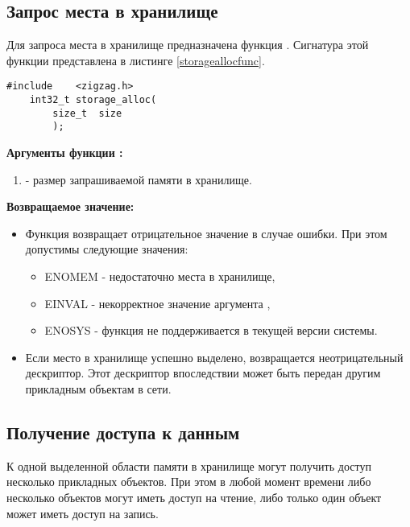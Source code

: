 \subsection{Запрос места в хранилище}

Для запроса места в хранилище предназначена функция . Сигнатура этой функции 
представлена в листинге \ref{storageallocfunc}.

\begin{lstlisting}[caption=Функция \myfunc{storage\_alloc()} - запрос места в хранилище, label=storageallocfunc]
    #include    <zigzag.h>
    int32_t storage_alloc(
        size_t  size
        );
\end{lstlisting}

{\bfseries Аргументы функции :}

{\itshape
\begin{enumerate} 
\item {} - размер запрашиваемой памяти в хранилище.
\end{enumerate}
}

{\bfseries Возвращаемое значение:}

{\itshape
\begin{itemize}
\item Функция возвращает отрицательное значение в случае ошибки. При этом допустимы следующие значения:
    \begin{itemize}
        \item ENOMEM - недостаточно места в хранилище,
        \item EINVAL - некорректное значение аргумента ,
        \item ENOSYS - функция не поддерживается в текущей версии системы.
    \end{itemize}
\item Если место в хранилище успешно выделено, возвращается неотрицательный дескриптор. Этот дескриптор впоследствии
может быть передан другим прикладным объектам в сети.
\end{itemize}
}

\subsection{Получение доступа к данным}

К одной выделенной области памяти в хранилище могут получить доступ несколько прикладных объектов. При этом
в любой момент времени либо несколько объектов могут иметь доступ на чтение, либо только один объект может иметь доступ на запись.

